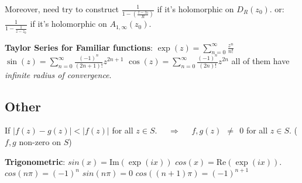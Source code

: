 \documentclass[9pt]{article}
\begin{document}
{\scriptsize \qquad Moreover, need try to construct $\frac{1}{1-(\frac{z-z_0}{R})}$ if it's holomorphic on $D_{R}(z_0)$. \qquad or: $\frac{1}{1-\frac{1}{z-z_0}}$ if it's holomorphic on $A_{1,\infty}(z_0)$.}

\textbf{Taylor Series for Familiar functions}: {\scriptsize $\exp(z)=\sum_{n=0}^{\infty}\frac{z^n}{n!}$ \quad $\sin(z)=\sum_{n=0}^{\infty}\frac{(-1)^n}{(2n+1)!}z^{2n+1}$ \quad $\cos(z)=\sum_{n=0}^{\infty}\frac{(-1)^n}{(2n)!}z^{2n}$ all of them have \textit{infinite radius of convergence}.}


\subsection{Other}

If $|f(z)-g(z)|<|f(z)|$ for all $z\in S$. \ \ $\Rightarrow$ \ \ $f,g(z) \ \ \ne \ \ 0$ for all $z\in S$. ($f,g$ non-zero on $S$)

\textbf{Trigonometric}: {\small $sin(x)=\text{Im}(\exp({ix}))$ \quad $cos(x)=\text{Re}(\exp({ix}))$. \quad \quad $cos(n\pi)=(-1)^n$ \quad $sin(n\pi)=0$ \quad $cos((n+1)\pi)=(-1)^{n+1}$}
\end{document}
